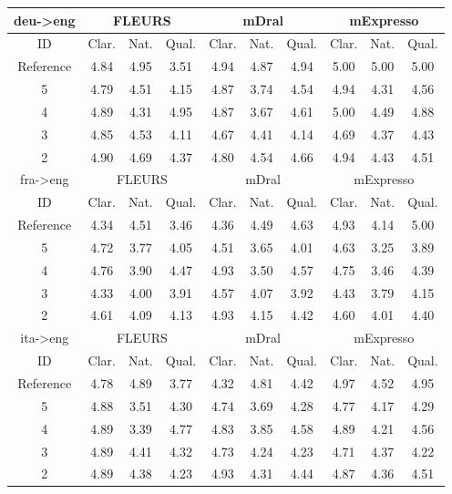 \begin{table}[!ht]
\tiny
\centering
\begin{tabular}{c|ccc|ccc|ccc}
\hline
deu->eng & \multicolumn{3}{c|}{FLEURS} & \multicolumn{3}{c|}{mDral} & \multicolumn{3}{c|}{mExpresso}\\
\hline
ID & Clar. & Nat. & Qual. & Clar. & Nat. & Qual. & Clar. & Nat. & Qual. \\
\hline
Reference & 4.84 & 4.95 & 3.51 & 4.94 & 4.87 & 4.94 & 5.00 & 5.00 & 5.00\\
5 & 4.79 & 4.51 & 4.15 & 4.87 & 3.74 & 4.54 & 4.94 & 4.31 & 4.56\\
4 & 4.89 & 4.31 & 4.95 & 4.87 & 3.67 & 4.61 & 5.00 & 4.49 & 4.88\\
3 & 4.85 & 4.53 & 4.11 & 4.67 & 4.41 & 4.14 & 4.69 & 4.37 & 4.43\\
2 & 4.90 & 4.69 & 4.37 & 4.80 & 4.54 & 4.66 & 4.94 & 4.43 & 4.51\\
\hline
fra->eng & \multicolumn{3}{c|}{FLEURS} & \multicolumn{3}{c|}{mDral} & \multicolumn{3}{c|}{mExpresso}\\
\hline
ID & Clar. & Nat. & Qual. & Clar. & Nat. & Qual. & Clar. & Nat. & Qual. \\
\hline
Reference & 4.34 & 4.51 & 3.46 & 4.36 & 4.49 & 4.63 & 4.93 & 4.14 & 5.00\\
5 & 4.72 & 3.77 & 4.05 & 4.51 & 3.65 & 4.01 & 4.63 & 3.25 & 3.89\\
4 & 4.76 & 3.90 & 4.47 & 4.93 & 3.50 & 4.57 & 4.75 & 3.46 & 4.39\\
3 & 4.33 & 4.00 & 3.91 & 4.57 & 4.07 & 3.92 & 4.43 & 3.79 & 4.15\\
2 & 4.61 & 4.09 & 4.13 & 4.93 & 4.15 & 4.42 & 4.60 & 4.01 & 4.40\\
\hline
ita->eng & \multicolumn{3}{c|}{FLEURS} & \multicolumn{3}{c|}{mDral} & \multicolumn{3}{c|}{mExpresso}\\
\hline
ID & Clar. & Nat. & Qual. & Clar. & Nat. & Qual. & Clar. & Nat. & Qual. \\
\hline
Reference & 4.78 & 4.89 & 3.77 & 4.32 & 4.81 & 4.42 & 4.97 & 4.52 & 4.95\\
5 & 4.88 & 3.51 & 4.30 & 4.74 & 3.69 & 4.28 & 4.77 & 4.17 & 4.29\\
4 & 4.89 & 3.39 & 4.77 & 4.83 & 3.85 & 4.58 & 4.89 & 4.21 & 4.56\\
3 & 4.89 & 4.41 & 4.32 & 4.73 & 4.24 & 4.23 & 4.71 & 4.37 & 4.22\\
2 & 4.89 & 4.38 & 4.23 & 4.93 & 4.31 & 4.44 & 4.87 & 4.36 & 4.51\\

\end{tabular}
\end{table}
